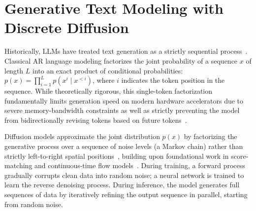 \documentclass[11pt, a4paper, logo, copyright, gdm]{google}
\begin{document}
\section{Generative Text Modeling with Discrete Diffusion} \label{sec:background}

Historically, LLMs have treated text generation as a strictly sequential process~\citep{bengio2003neural, mikolov2010recurrent, graves2013generating, sutskever2014sequence, Vaswani2017, gu2018nonautoregressive}. Classical AR language modeling factorizes the joint probability of a sequence $x$ of length $L$ into an exact product of conditional probabilities: $p(x) = \prod_{i=1}^L p(x^i \mid x^{<i})$, where $i$ indicates the token position in the sequence. While theoretically rigorous, this single-token factorization fundamentally limits generation speed on modern hardware accelerators due to severe memory-bandwidth constraints as well as strictly preventing the model from bidirectionally revising tokens based on future tokens~\citep{leviathan2023fast, savinov2022sundae}.

Diffusion models approximate the joint distribution $p(x)$ by factorizing the generative process over a sequence of noise levels (a Markov chain) rather than strictly left-to-right spatial positions~\citep{sohl2015deep, ho2020denoising, song2020score, holderrieth2025}, building upon foundational work in score-matching and continuous-time flow models~\citep{song2019generative, song2021denoising, song2021maximum, meng2022sdedit, lipman2023flow, debortoli2021diffusion}. During training, a forward process gradually corrupts clean data into random noise; a neural network is trained to learn the reverse denoising process. During inference, the model generates full sequences of data by iteratively refining the output sequence in parallel, starting from random noise.
\end{document}
